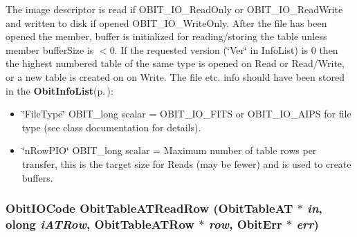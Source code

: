 The image descriptor is read if OBIT\_\-IO\_\-Read\-Only or OBIT\_\-IO\_\-Read\-Write and written to disk if opened OBIT\_\-IO\_\-Write\-Only. After the file has been opened the member, buffer is initialized for reading/storing the table unless member buffer\-Size is $<$0. If the requested version (\char`\"{}Ver\char`\"{} in Info\-List) is 0 then the highest numbered table of the same type is opened on Read or Read/Write, or a new table is created on on Write. The file etc. info should have been stored in the {\bf Obit\-Info\-List}{\rm (p.\,\pageref{structObitInfoList})}: \begin{itemize}
\item \char`\"{}File\-Type\char`\"{} OBIT\_\-long scalar = OBIT\_\-IO\_\-FITS or OBIT\_\-IO\_\-AIPS for file type (see class documentation for details). \item \char`\"{}n\-Row\-PIO\char`\"{} OBIT\_\-long scalar = Maximum number of table rows per transfer, this is the target size for Reads (may be fewer) and is used to create buffers. 
\end{itemize}
\subsubsection{\setlength{\rightskip}{0pt plus 5cm}Obit\-IOCode Obit\-Table\-ATRead\-Row ({\bf Obit\-Table\-AT} $\ast$ {\em in}, {\bf olong} {\em i\-ATRow}, {\bf Obit\-Table\-ATRow} $\ast$ {\em row}, {\bf Obit\-Err} $\ast$ {\em err})}\label{ObitTableAT_8h_a18}



